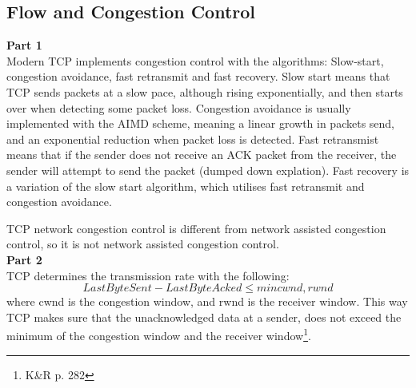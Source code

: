\subsection{Flow and Congestion Control}
\textbf{Part 1}\\
Modern TCP implements congestion control with the algorithms:
Slow-start, congestion avoidance, fast retransmit and fast
recovery. Slow start means that TCP sends packets at a slow pace,
although rising exponentially, and then starts over when detecting
some packet loss. Congestion avoidance is usually implemented with the
AIMD scheme, meaning a linear growth in packets send, and an
exponential reduction when packet loss is detected. Fast retransmist
means that if the sender does not receive an ACK packet from the
receiver, the sender will attempt to send the packet (dumped down
explation). Fast recovery is a variation of the slow start algorithm,
which utilises fast retransmit and congestion avoidance.

TCP network congestion control is different from network assisted congestion
control, so it is not network assisted congestion control.\\

\noindent \textbf{Part 2}\\
TCP determines the transmission rate with the following:
\[
LastByteSent - LastByteAcked \leq min{cwnd, rwnd}
\]
where cwnd is the congestion window, and rwnd is the receiver
window. This way TCP makes sure that the unacknowledged data at a
sender, does not exceed the minimum of the congestion window and the
receiver window\footnote{K\&R p. 282}.